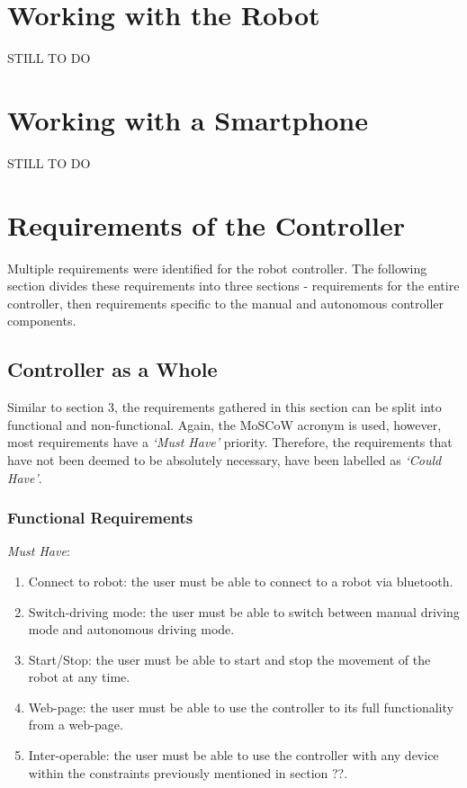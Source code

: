 \documentclass{l4proj}
\begin{document}
\section{Working with the Robot}
STILL TO DO

\section{Working with a Smartphone}
STILL TO DO

\section{Requirements of the Controller}
Multiple requirements were identified for the robot controller. The following section divides these requirements into three sections - requirements for the entire controller, then requirements specific to the manual and autonomous controller components.

\subsection{Controller as a Whole}
Similar to section 3, the requirements gathered in this section can be split into functional and non-functional. Again, the MoSCoW acronym is used, however, most requirements have a \textit{‘Must Have’} priority. Therefore, the requirements that have not been deemed to be absolutely necessary, have been labelled as \textit{‘Could Have’}.

\subsubsection{Functional Requirements}
\textit{Must Have}:
\begin{enumerate}[label=\arabic{chapter}.\arabic*]
    \item Connect to robot: the user must be able to connect to a robot via bluetooth.
    \item Switch-driving mode: the user must be able to switch between manual driving mode and autonomous driving mode.
    \item Start/Stop: the user must be able to start and stop the movement of the robot at any time.
    \item Web-page: the user must be able to use the controller to its full functionality from a web-page.
    \item Inter-operable: the user must be able to use the controller with any device within the constraints previously mentioned in section ??.
\end{enumerate}
\end{document}
